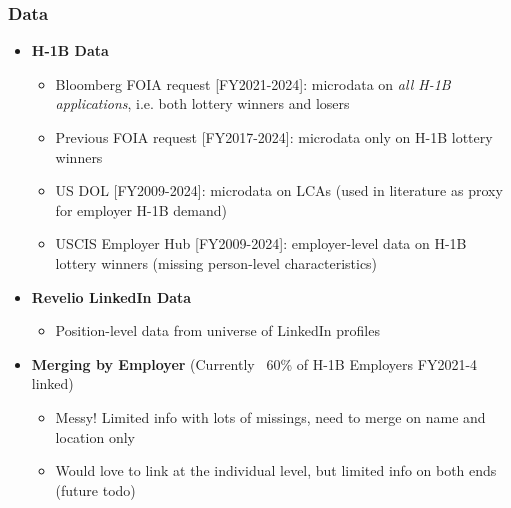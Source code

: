 \documentclass[xcolor=dvipsnames, compress, 12pt, aspectratio=169, handout]{beamer}
\begin{document}
\begin{frame}
    \frametitle{Data}
    \begin{itemize}
        \item \textbf{H-1B Data}
        \begin{itemize}
            \item Bloomberg FOIA request [FY2021-2024]: microdata on \textit{all H-1B applications}, i.e. both lottery winners and losers
            \item Previous FOIA request [FY2017-2024]: microdata only on H-1B lottery winners 
            \item US DOL [FY2009-2024]: microdata on LCAs (used in literature as proxy for employer H-1B demand)
            \item USCIS Employer Hub [FY2009-2024]: employer-level data on H-1B lottery winners (missing person-level characteristics)
        \end{itemize} 
        \item \textbf{Revelio LinkedIn Data}
        \begin{itemize}
            \item Position-level data from universe of LinkedIn profiles
        \end{itemize}
        \item \textbf{Merging by Employer} (Currently ~60\% of H-1B Employers FY2021-4 linked)
        \begin{itemize}
            \item Messy! Limited info with lots of missings, need to merge on name and location only
            \item Would love to link at the individual level, but limited info on both ends (future todo)
        \end{itemize}
    \end{itemize}
\end{frame}
\end{document}

